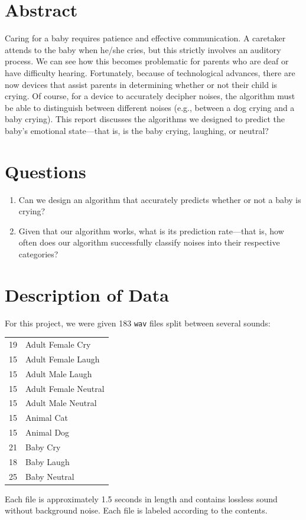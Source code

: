 \documentclass[paper=a4, fontsize=11pt]{scrartcl}
\numberwithin{equation}{section}
\numberwithin{figure}{section}
\numberwithin{table}{section}
\begin{document}
\section{Abstract}
%
% 
%
Caring for a baby requires patience and effective communication. A caretaker attends to the baby when he/she cries, but this strictly involves an auditory process. We can see how this becomes problematic for parents who are deaf or have difficulty hearing. Fortunately, because of technological advances, there are now devices that assist parents in determining whether or not their child is crying. Of course, for a device to accurately decipher noises, the algorithm must be able to distinguish between different noises (e.g., between a dog crying and a baby crying). This report discusses the algorithms we designed to predict the baby's emotional state---that is, is the baby crying, laughing, or neutral? 


\section{Questions}
\begin{enumerate}
	\item Can we design an algorithm that accurately predicts whether or not a baby is crying?
	\item Given that our algorithm works, what is its prediction rate---that is, how often does our algorithm successfully classify noises into their respective categories?
\end{enumerate}

%

\section{Description of Data}
For this project, we were given 183 \texttt{wav} files split between several sounds:
\begin{center}
\begin{tabular}{r l}
19 & Adult Female Cry\\
15 & Adult Female Laugh \\
15 & Adult Male Laugh \\
15 & Adult Female Neutral \\
15 & Adult Male Neutral \\
15 & Animal Cat\\
15 & Animal Dog\\
21 & Baby Cry \\
18 & Baby Laugh \\
25 & Baby Neutral
\end{tabular}
\end{center}
Each file is approximately 1.5 seconds in length and contains lossless sound without background noise. Each file is labeled according to the contents. 
\end{document}
